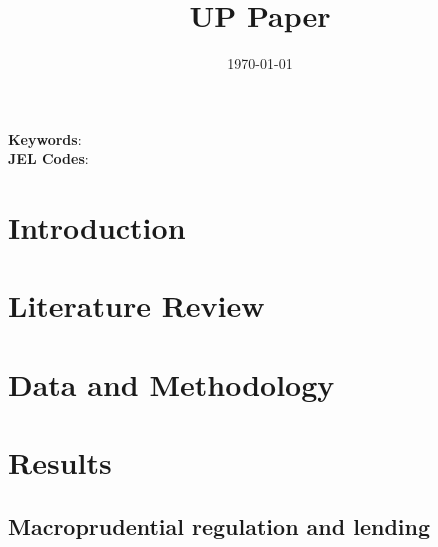 \documentclass[
  letterpaper,
  DIV=11,
  numbers=noendperiod]{scrartcl}
\author{}
\date{}
\begin{document}
\title{UP Paper}



\date{\today}
\maketitle

\begin{abstract}


\end{abstract}

\noindent\textbf{Keywords}:    \\
\textbf{JEL Codes}: 
\newpage

\ifdefined\Shaded\renewenvironment{Shaded}{\begin{tcolorbox}[sharp corners, breakable, borderline west={3pt}{0pt}{shadecolor}, frame hidden, interior hidden, boxrule=0pt, enhanced]}{\end{tcolorbox}}\fi

\hypertarget{introduction}{%
\section{Introduction}\label{introduction}}

\hypertarget{literature-review}{%
\section{Literature Review}\label{literature-review}}

\citet{alexakis2023animal}

\hypertarget{data-and-methodology}{%
\section{Data and Methodology}\label{data-and-methodology}}

\newpage

\hypertarget{results}{%
\section{Results}\label{results}}

\hypertarget{macroprudential-regulation-and-lending}{%
\subsection{Macroprudential regulation and
lending}\label{macroprudential-regulation-and-lending}}
\end{document}
